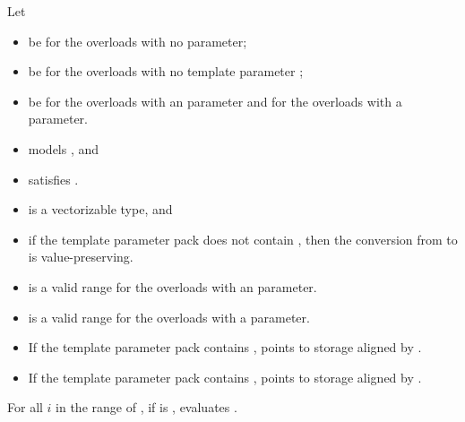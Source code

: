 \begin{itemdescr}
\pnum
Let
\begin{itemize}
 \item
    be  for the
   overloads with no  parameter;
 \item
    be  for the overloads with no
   template parameter ;
 \item
    be  for the overloads with an 
   parameter and  for the overloads with a 
   parameter.
\end{itemize}

\pnum
\constraints
\begin{itemize}
 \item
    models
   , and
 \item
   satisfies
  .
\end{itemize}

\pnum
\mandates
\begin{itemize}
 \item
    is a vectorizable type, and
 \item
   if the template parameter pack  does not contain
   , then the conversion from  to
    is value-preserving.
\end{itemize}

\pnum
\expects
\begin{itemize}
 \item
    is a valid range for the overloads with an
    parameter.
 \item
    is a valid range for the overloads with a 
   parameter.
 \item
   If the template parameter pack  contains
   ,  points to storage
   aligned by .
 \item
   If the template parameter pack  contains
   ,  points to
   storage aligned by .
\end{itemize}

\pnum
\effects
For all $i$ in the range of , if
 is , evaluates
.
\end{itemdescr}

